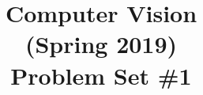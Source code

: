 \documentclass[aspectratio=169]{beamer}
\title{Computer Vision\\ 
	    (Spring 2019) \\ 
	    Problem Set \#1}
\author{\yourInfo{}}
\date{}
\begin{document}
	
	\frame{\titlepage}
	
	
	
	
	
	
	
	
\end{document}

